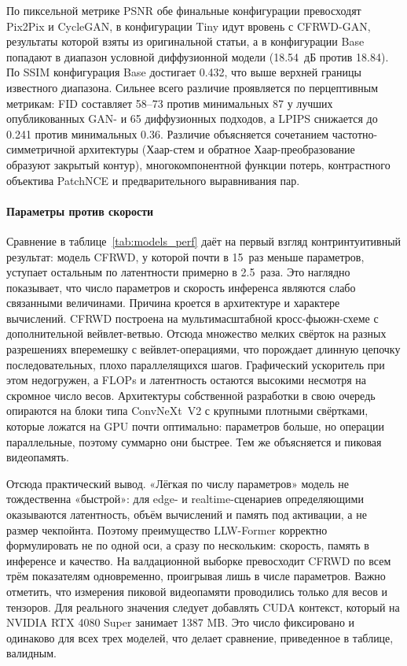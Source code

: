 По пиксельной метрике PSNR обе финальные конфигурации превосходят Pix2Pix и
CycleGAN, в конфигурации Tiny идут вровень с CFRWD-GAN, результаты которой взяты из оригинальной статьи, а в конфигурации Base
попадают в диапазон условной диффузионной модели (18.54~дБ против 18.84).
По SSIM конфигурация Base достигает 0.432, что выше верхней границы известного
диапазона. Сильнее всего различие проявляется по перцептивным метрикам: FID
составляет 58--73 против минимальных 87 у лучших опубликованных GAN- и 65
диффузионных подходов, а LPIPS снижается до 0.241 против минимальных 0.36.
Различие объясняется сочетанием частотно-симметричной архитектуры (Хаар-стем и
обратное Хаар-преобразование образуют закрытый контур), многокомпонентной функции
потерь, контрастного объектива PatchNCE и предварительного выравнивания пар.

\paragraph{Параметры против скорости}
Сравнение в таблице~\ref{tab:models_perf} даёт на первый взгляд контринтуитивный результат: модель CFRWD, у которой почти в 15~раз меньше параметров, уступает остальным по латентности примерно в 2.5~раза.
Это наглядно показывает, что число параметров и скорость инференса являются слабо связанными величинами.
Причина кроется в архитектуре и характере вычислений.
CFRWD построена на мультимасштабной кросс-фьюжн-схеме с дополнительной вейвлет-ветвью.
Отсюда множество мелких свёрток на разных разрешениях вперемешку с вейвлет-операциями, что порождает длинную цепочку последовательных, плохо параллелящихся шагов.
Графический ускоритель при этом недогружен, а FLOPs и латентность остаются высокими несмотря на скромное число весов.
Архитектуры собственной разработки в свою очередь опираются на блоки типа ConvNeXt~V2 с крупными плотными свёртками, которые ложатся на GPU почти оптимально: параметров больше, но операции параллельные, поэтому суммарно они быстрее.
Тем же объясняется и пиковая видеопамять.

Отсюда практический вывод.
«Лёгкая по числу параметров» модель не тождественна «быстрой»: для edge- и realtime-сценариев определяющими оказываются латентность, объём вычислений и память под активации, а не размер чекпойнта.
Поэтому преимущество LLW-Former корректно формулировать не по одной оси, а сразу по нескольким: скорость, память в инференсе и качество.
На валдационной выборке превосходит CFRWD по всем трём показателям одновременно, проигрывая лишь в числе параметров.
Важно отметить, что измерения пиковой видеопамяти проводились только для весов и тензоров. Для реального значения следует добавлять CUDA контекст, который на NVIDIA RTX 4080 Super занимает 1387 MB.
Это число фиксировано и одинаково для всех трех моделей, что делает сравнение, приведенное в таблице, валидным.

